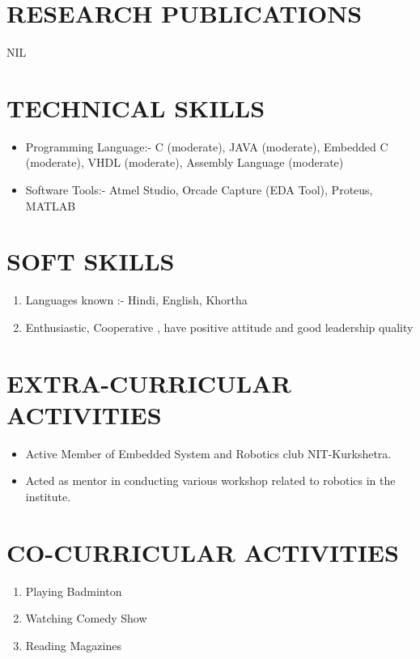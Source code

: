 \documentclass[11pt,a4paper,sans]{moderncv}
\begin{document}
\section{RESEARCH PUBLICATIONS}
NIL 
\newline \newline
\section{TECHNICAL SKILLS}
\begin{itemize}
\item Programming Language:- C (moderate), JAVA (moderate), Embedded C (moderate),  VHDL (moderate), Assembly Language (moderate)
\item Software Tools:- Atmel Studio,  Orcade Capture (EDA Tool), Proteus, MATLAB
\end{itemize}
\section{SOFT SKILLS}
\begin{enumerate}
\item Languages known :- Hindi, English, Khortha
\item Enthusiastic, Cooperative , have positive attitude and good leadership quality
\end{enumerate}

\section{EXTRA-CURRICULAR ACTIVITIES}
\begin{itemize}
\item Active Member of Embedded System and Robotics club NIT-Kurkshetra.
\item Acted as mentor in conducting various workshop related to robotics in the institute. 
\end{itemize}
\section{CO-CURRICULAR ACTIVITIES}
\begin{enumerate}
\item Playing Badminton
\item Watching Comedy Show
\item Reading Magazines
\end{enumerate}
\end{document}
